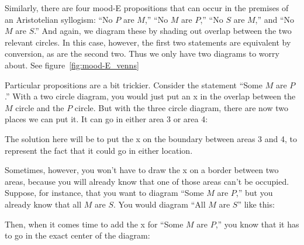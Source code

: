 
Similarly, there are four mood-E propositions that can occur in the premises of an Aristotelian syllogism: ``No $P$ are $M$,'' ``No $M$ are $P$,'' ``No $S$ are $M$,'' and ``No $M$ are $S$.'' And again, we diagram these by shading out overlap between the two relevant circles. In this case, however, the first two statements are equivalent by conversion, as are the second two. Thus we only have two diagrams to worry about. See figure~\ref{fig:mood-E_venns}



Particular propositions are a bit trickier. Consider the statement ``Some $M$ are $P$.'' With a two circle diagram, you would just put an x in the overlap between the $M$ circle and the $P$ circle. But with the three circle diagram, there are now two places we can put it. It can go in either area 3 or area 4:



The solution here will be to put the x on the boundary between areas 3 and 4, to represent the fact that it could go in either location.



Sometimes, however, you won't have to draw the x on a border between two areas, because you will already know that one of those areas can't be occupied. Suppose, for instance, that you want to diagram ``Some $M$ are $P$,'' but you already know that all $M$ are $S$. You would diagram ``All $M$ are $S$'' like this:


Then, when it comes time to add the x for ``Some $M$ are $P$,'' you know that it has to go in the exact center of the diagram:

